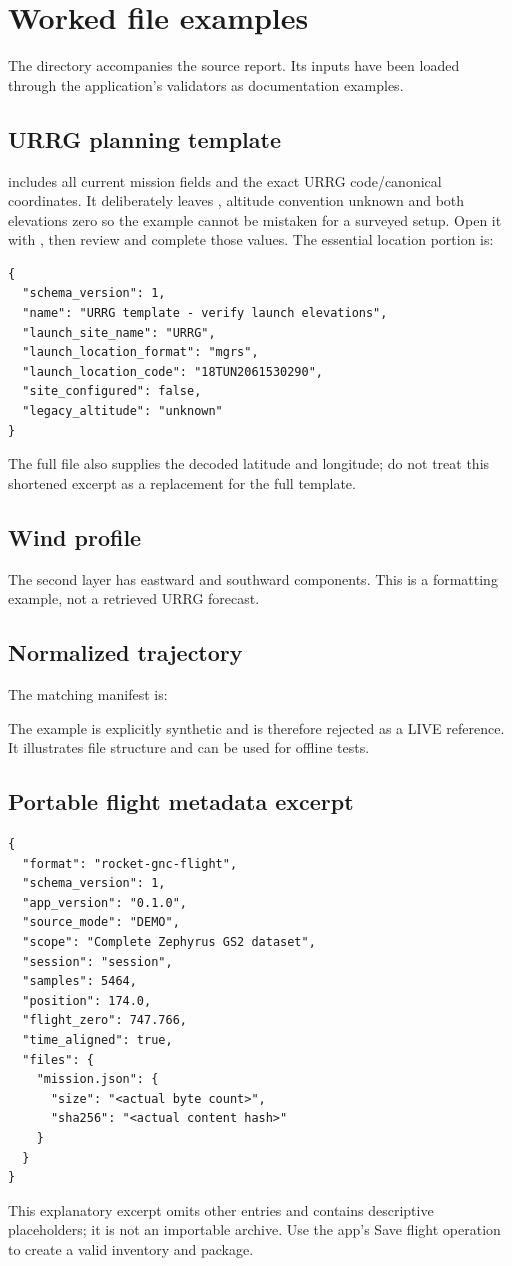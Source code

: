 \section{Worked file examples}\label{app:examples}
The  directory accompanies the source report. Its inputs have been
loaded through the application's validators as documentation examples.

\subsection{URRG planning template}
 includes all current mission fields and the
exact URRG code/canonical coordinates. It deliberately leaves
, altitude convention unknown and both elevations
zero so the example cannot be mistaken for a surveyed setup. Open it with
, then review and complete those values. The essential location
portion is:
\begin{lstlisting}
{
  "schema_version": 1,
  "name": "URRG template - verify launch elevations",
  "launch_site_name": "URRG",
  "launch_location_format": "mgrs",
  "launch_location_code": "18TUN2061530290",
  "site_configured": false,
  "legacy_altitude": "unknown"
}
\end{lstlisting}
The full file also supplies the decoded latitude and longitude; do not treat
this shortened excerpt as a replacement for the full template.

\subsection{Wind profile}

The second layer has eastward and southward components. This is a formatting
example, not a retrieved URRG forecast.

\subsection{Normalized trajectory}

The matching manifest is:

The example is explicitly synthetic and is therefore rejected as a LIVE
reference. It illustrates file structure and can be used for offline tests.

\subsection{Portable flight metadata excerpt}
\begin{lstlisting}
{
  "format": "rocket-gnc-flight",
  "schema_version": 1,
  "app_version": "0.1.0",
  "source_mode": "DEMO",
  "scope": "Complete Zephyrus GS2 dataset",
  "session": "session",
  "samples": 5464,
  "position": 174.0,
  "flight_zero": 747.766,
  "time_aligned": true,
  "files": {
    "mission.json": {
      "size": "<actual byte count>",
      "sha256": "<actual content hash>"
    }
  }
}
\end{lstlisting}
This explanatory excerpt omits other entries and contains descriptive
placeholders; it is not an importable archive. Use the app's Save flight
operation to create a valid inventory and package.

